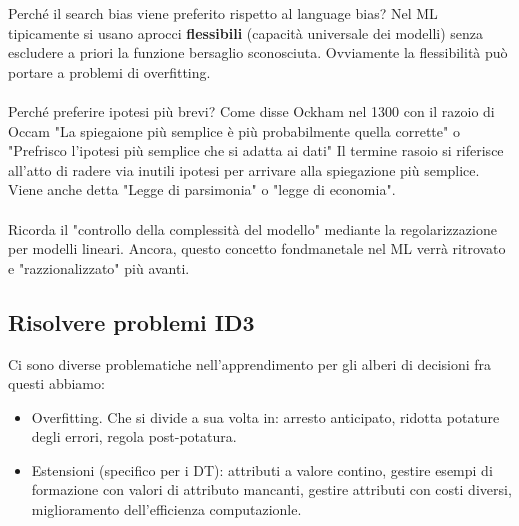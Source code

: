 Perché il search bias viene preferito rispetto al language bias? Nel ML tipicamente si usano aprocci \textbf{flessibili} (capacità universale dei modelli) senza
escludere a priori la funzione bersaglio sconosciuta. Ovviamente la flessibilità può portare a problemi di overfitting.\\\\
Perché preferire ipotesi più brevi? Come disse Ockham nel 1300 con il razoio di Occam "La spiegaione più semplice è più probabilmente quella corrette" o
"Prefrisco l'ipotesi più semplice che si adatta ai dati" Il termine rasoio si riferisce all'atto di radere via inutili ipotesi per arrivare alla spiegazione più semplice. Viene anche detta
"Legge di parsimonia" o "legge di economia".\\\\
Ricorda il "controllo della complessità del modello" mediante la regolarizzazione per modelli lineari. Ancora, questo concetto fondmanetale
nel ML verrà ritrovato e "razzionalizzato" più avanti.

\subsection{Risolvere problemi ID3}
Ci sono diverse problematiche nell'apprendimento per gli alberi di decisioni fra questi abbiamo:
\begin{itemize}
    \item Overfitting. Che si divide a sua volta in: arresto anticipato, ridotta potature degli errori, regola post-potatura.
    \item Estensioni (specifico per i DT): attributi a valore contino, gestire esempi di formazione con valori di attributo mancanti, gestire attributi con costi diversi, miglioramento dell'efficienza computazionle.
\end{itemize}

